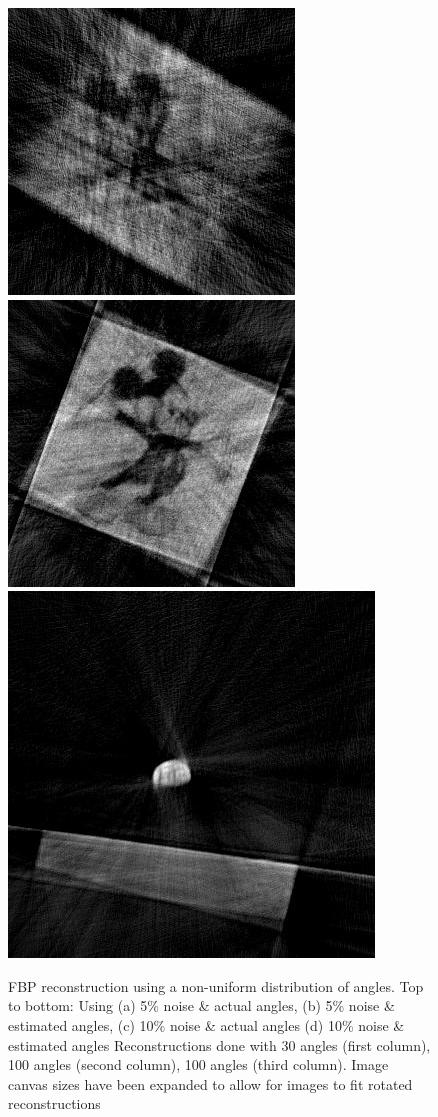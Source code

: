 \documentclass{article}
\begin{document}
\begin{figure}[!ht]
\includegraphics[width=0.3\linewidth]{images/mickey_nonunif_10pc_30_10_6_5_estimatedangles.jpg}
\includegraphics[width=0.3\linewidth]{images/mickey_nonunif_10pc_100_10_6_5_estimatedangles.jpg}
\includegraphics[width=0.3\linewidth]{images/earthrise_nonunif_10pc_100_10_6_5_estimatedangles.jpg}
\caption{FBP reconstruction using a non-uniform distribution of angles.
Top to bottom: Using (a) 5\% noise \& actual angles, (b) 5\% noise \& estimated angles, (c) 10\% noise \& actual angles (d) 10\% noise \& estimated angles
Reconstructions done with 30 angles (first column), 100 angles (second column), 100 angles (third column). 
Image canvas sizes have been expanded to allow for images to fit rotated reconstructions}
\label{fig:recon}
\end{figure}
\end{document}
